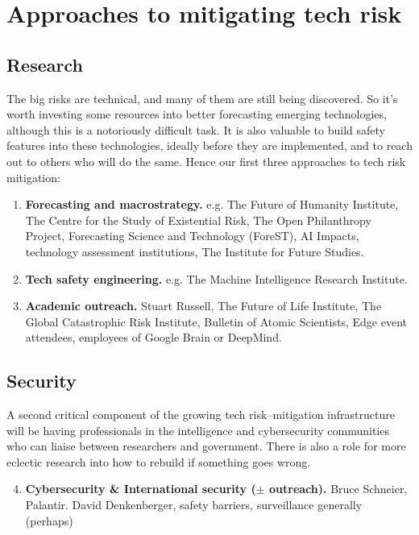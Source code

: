 ﻿\documentclass[12pt]{article}
\begin{document}
\section{Approaches to mitigating tech risk}
\subsection*{Research}
The big risks are technical, and many of them are still being discovered. So it's worth investing some resources into better forecasting emerging technologies, although this is a notoriously difficult task. It is also valuable to build safety features into these technologies, ideally before they are implemented, and to reach out to others who will do the same. Hence our first three approaches to tech risk mitigation:

\begin{enumerate}[label=\textbf{\arabic*})]
    \item {\bfseries Forecasting and macrostrategy.} e.g. The Future of Humanity Institute, The Centre for the Study of Existential Risk, The Open Philanthropy Project, Forecasting Science and Technology (ForeST), AI Impacts, technology assessment institutions, The Institute for Future Studies.
    \item {\bfseries Tech safety engineering.} e.g. The Machine Intelligence Research Institute.
\item {\bfseries Academic outreach.} Stuart Russell, The Future of Life Institute, The Global Catastrophic Risk Institute, Bulletin of Atomic Scientists, Edge event attendees, employees of Google Brain or DeepMind.
\end{enumerate}

\subsection*{Security}
A second critical component of the growing tech risk--mitigation infrastructure will be having professionals in the intelligence and cybersecurity communities who can liaise between researchers and government. There is also a role for more eclectic research into how to rebuild if something goes wrong.
\begin{enumerate}[label=\textbf{\arabic*})]
        \setcounter{enumi}{3}
    \item {\bfseries Cybersecurity \& International security (\(\mathbf{\pm}\) outreach).} Bruce Schneier, Palantir. David Denkenberger, safety barriers, surveillance generally (perhaps)
\end{enumerate}
\end{document}
